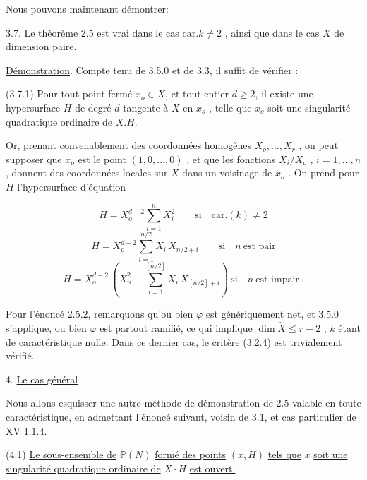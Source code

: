 Nous pouvons maintenant démontrer:

3.7.  Le théorème 2.5 est vrai dans le cas $\mathrm{car}.k \neq 2$ , ainsi que dans le cas $X$ de dimension paire.

\underline{Démonstration}.  Compte tenu de 3.5.0 et de 3.3, il suffit de vérifier :

(3.7.1) Pour tout point fermé $x_o \in X$, et tout entier $d \geqslant 2$, il existe une hypersurface $H$ de degré $d$ tangente à $X$ en $x_o$ , telle que $x_o$ soit une singularité quadratique ordinaire de $X.H$.

Or, prenant convenablement des coordonnées homogènes $X_o,\ldots,X_r$ , on peut supposer que $x_o$ est le point $(1,0,\ldots,0)$ , et que les fonctions $X_i/X_o$ , $i = 1,\ldots,n$ , donnent des coordonnées locales sur $X$ dans un voisinage de $x_o$ . On prend pour $H$ l'hypersurface d'équation

\begin{equation}\tag{3.7.1.1}
H = X_o^{d-2} \sum_{i=1}^{n} X_i^2 \qquad \text{si} \quad \mathrm{car}.(k) \neq 2
\end{equation}
\begin{equation}\tag{3.7.1.2}
H = X_o^{d-2} \sum_{i=1}^{n/2} X_i \, X_{n/2+i} \qquad \text{si} \quad n \ \text{est pair}
\end{equation}
\begin{equation}\tag{3.7.1.3}
H = X_o^{d-2} \, (X_n^2 + \sum_{i=1}^{[n/2]} X_i \, X_{[n/2]+i}) \ \text{si} \quad n \ \text{est impair} \ .
\end{equation}


Pour l'énoncé 2.5.2, remarquons qu'ou bien $\varphi$ est génériquement net, et 3.5.0 s'applique, ou bien $\varphi$ est partout ramifié, ce qui implique $\dim \check{X} \leqslant r-2$ , $k$ étant de caractéristique nulle. Dans ce dernier cas, le critère (3.2.4) est trivialement vérifié.


4.  \underline{Le cas général}

Nous allons esquisser une autre méthode de démonstration de 2.5 valable en toute caractéristique, en admettant l'énoncé suivant, voisin de 3.1, et cas particulier de XV 1.1.4.

(4.1) \underline{Le sous-ensemble de} $\mathbb{P}(N)$ \underline{formé des points} $(x, H)$ \underline{tels que} $x$ \underline{soit une singularité quadratique ordinaire de} $X \cdot H$ \underline{est ouvert.}


